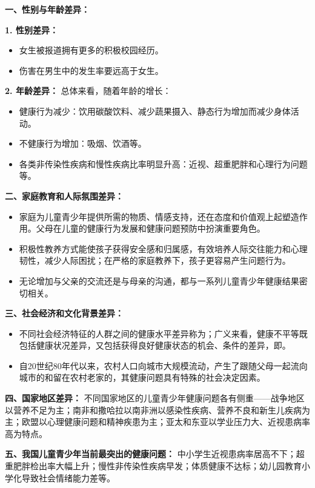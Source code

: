 \begin{keybox}
\textbf{一、性别与年龄差异：}

\textbf{1. 性别差异：}
\begin{itemize}[leftmargin=*]
    \item 女生被报道拥有更多的积极校园经历。
    \item 伤害在男生中的发生率要远高于女生。
\end{itemize}

\textbf{2. 年龄差异：}
总体来看，随着年龄的增长：
\begin{itemize}[leftmargin=*]
    \item 健康行为减少：饮用碳酸饮料、减少蔬果摄入、静态行为增加而减少身体活动。
    \item 不健康行为增加：吸烟、饮酒等。
    \item 各类非传染性疾病和慢性疾病比率明显升高：近视、超重肥胖和心理行为问题等。
\end{itemize}

\textbf{二、家庭教育和人际氛围差异：}
\begin{itemize}[leftmargin=*]
    \item 家庭为儿童青少年提供所需的物质、情感支持，还在态度和价值观上起塑造作用。父母在儿童的健康行为发展和健康问题预防中扮演重要角色。
    \item 积极性教养方式能使孩子获得安全感和归属感，有效培养人际交往能力和心理韧性，减少人际困扰；在严格的家庭教养下，孩子更容易产生问题行为。
    \item 无论增加与父亲的交流还是与母亲的沟通，都与一系列儿童青少年健康结果密切相关。
\end{itemize}

\textbf{三、社会经济和文化背景差异：}
\begin{itemize}[leftmargin=*]
    \item 不同社会经济特征的人群之间的健康水平差异称为；广义来看，健康不平等既包括健康状况差异，又包括获得良好健康状态的机会、条件的差异，即。
    \item 自20世纪80年代以来，农村人口向城市大规模流动，产生了跟随父母一起流向城市的和留在农村老家的，其健康问题具有特殊的社会决定因素。
\end{itemize}

\textbf{四、国家地区差异：}
不同国家地区的儿童青少年健康问题各有侧重——战争地区以营养不足为主；南非和撒哈拉以南非洲以感染性疾病、营养不良和新生儿疾病为主；欧盟以心理健康问题和精神疾患为主；亚太和东亚以学业压力大、近视患病率高为特点。

\textbf{五、我国儿童青少年当前最突出的健康问题：}
中小学生近视患病率居高不下；超重肥胖检出率大幅上升；慢性非传染性疾病早发；体质健康不达标；幼儿园教育小学化导致社会情绪能力差等。
\end{keybox}

